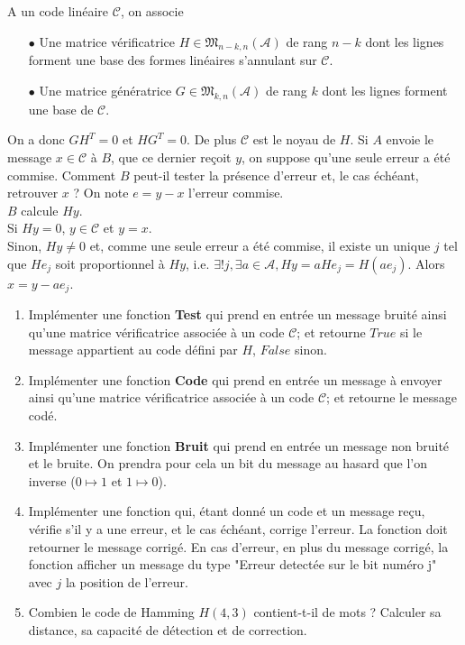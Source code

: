 A un code linéaire $\mathcal C$, on associe
\begin{itemize}
\item[$\bullet$] Une matrice vérificatrice $H\in \mathfrak M_{n-k,n}(\mathcal A)$ de rang $n-k$ dont les lignes forment une base des formes linéaires s'annulant sur $\mathcal C$.
\item[$\bullet$] Une matrice génératrice $G\in \mathfrak M_{k,n}(\mathcal A)$ de rang $k$ dont les lignes forment une base de $\mathcal C$.\\
\end{itemize}

On a donc $GH^T = 0$ et $HG^T=0$. De plus $\mathcal C$ est le noyau de $H$. Si $A$ envoie le message $x\in \mathcal C$ à $B$, que ce dernier reçoit $y$, on suppose qu'une seule erreur a été commise. Comment $B$ peut-il tester la présence d'erreur et, le cas échéant, retrouver $x$ ? On note $e=y-x$ l'erreur commise.\\

$B$ calcule $Hy$. \\
Si $Hy=0$, $y\in \mathcal C$ et $y=x$.\\
Sinon, $Hy\neq 0$ et, comme une seule erreur a été commise, il existe un unique $j$ tel que $He_j$ soit proportionnel à $Hy$, i.e. $\exists ! j, \exists a\in \mathcal A, Hy=aHe_j = H(ae_j)$. Alors $x=y-ae_j$.\\
 
\begin{enumerate}
\item Implémenter une fonction \textbf{Test} qui prend en entrée un message bruité ainsi qu'une matrice vérificatrice associée à un code $\mathcal C$; et retourne $True$ si le message appartient au code défini par $H$, $False$ sinon.
\item Implémenter une fonction \textbf{Code} qui prend en entrée un message à envoyer ainsi qu'une matrice vérificatrice associée à un code $\mathcal C$; et retourne le message codé.
\item Implémenter une fonction \textbf{Bruit} qui prend en entrée un message non bruité et le bruite. On prendra pour cela un bit du message au hasard que l'on inverse ($0\mapsto 1$ et $1\mapsto 0$).
\item Implémenter une fonction qui, étant donné un code et un message reçu, vérifie s'il y a une erreur, et le cas échéant, corrige l'erreur. La fonction doit retourner le message corrigé. En cas d'erreur, en plus du message corrigé, la fonction afficher un message du type "Erreur detectée sur le bit numéro j" avec $j$ la position de l'erreur.
\item Combien le code de Hamming $H(4,3)$ contient-t-il de mots ? Calculer sa distance, sa capacité de détection et de correction.
\end{enumerate}

